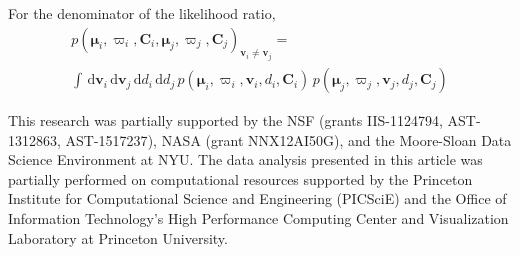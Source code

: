 \documentclass[manuscript, letterpaper]{aastex6}
\newcommand{\project}[1]{\textsl{#1}}
\newcommand{\acronym}[1]{{\small{#1}}}
\newcommand{\apogee}{\project{\acronym{APOGEE}}}
\newcommand{\dd}{\mathrm{d}}
\newcommand{\bs}[1]{\boldsymbol{#1}}
\newcommand{\propm}{\bs{\mu}}
\newcommand{\matrx}[1]{\mathbf{#1}}
\begin{document}
For the denominator of the likelihood ratio,
\begin{multline}
  p(\propm_i, \varpi_i, \matrx{C}_i, \propm_j, \varpi_j, \matrx{C}_j)_{\bs{v}_i \neq \bs{v}_j} = \\
    \int \, \dd \bs{v}_i \, \dd \bs{v}_j \, \dd d_i \, \dd d_j \,
    p(\propm_i, \varpi_i, \bs{v}_i, d_i, \matrx{C}_i) \,
    p(\propm_j, \varpi_j, \bs{v}_j, d_j, \matrx{C}_j)
\end{multline}


\acknowledgements

This research was partially supported by the \acronym{NSF} (grants
  \acronym{IIS-1124794}, \acronym{AST-1312863}, \acronym{AST-1517237}),
  \acronym{NASA} (grant \acronym{NNX12AI50G}),
  and the Moore-Sloan Data Science Environment at \acronym{NYU}. The data
analysis presented in this article was partially performed on computational
resources supported by the Princeton Institute for Computational Science and
Engineering (PICSciE) and the Office of Information Technology's High
Performance Computing Center and Visualization Laboratory at Princeton
University.





\end{document}
